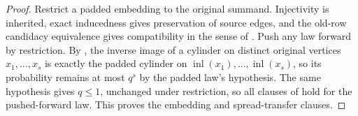 \begin{proof}
Restrict a padded embedding to the original summand.  Injectivity is inherited, exact inducedness gives preservation of source edges, and the old-row candidacy equivalence gives compatibility in the sense of .  Push any law forward by restriction.  By , the inverse image of a cylinder on distinct original vertices $x_1,\ldots,x_s$ is exactly the padded cylinder on $\operatorname{inl}(x_1),\ldots,\operatorname{inl}(x_s)$, so its probability remains at most $q^s$ by the padded law's  hypothesis.  The same hypothesis gives $q\leq1$, unchanged under restriction, so all clauses of  hold for the pushed-forward law.  This proves the embedding and spread-transfer clauses.
\end{proof}

